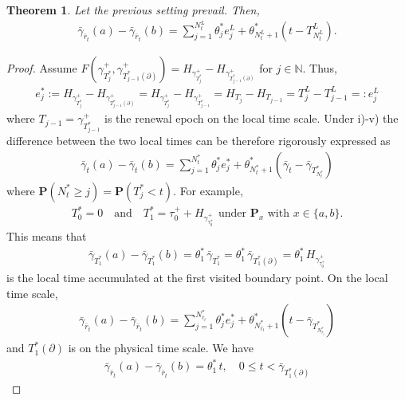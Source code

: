 \documentclass[10pt,a4paper]{article}
\numberwithin{equation}{section}
\theoremstyle{plain}
\newtheorem{theorem}{Theorem}
\theoremstyle{remark}
\begin{document}
\begin{theorem}
Let the previous setting prevail. Then, 
\begin{align}
\bar{\gamma}_{\bar{r}_t}(a) - \bar{\gamma}_{\bar{r}_t}(b) = \sum_{j=1}^{N^L_t} \theta^*_j e^L_j + \theta^*_{N^L_t+1} \left( t - T^L_{N^L_t} \right).
\label{thmDifLTbar} 
\end{align}
\label{thm:DifLTbar}
\end{theorem}


\begin{proof}
Assume $F(\gamma^+_{T^*_j}, \gamma^+_{T^*_{j-1}(\partial)}) = H_{\gamma^+_{T^*_j}} - H_{\gamma^+_{T^*_{j-1}(\partial)}}$ for $j \in \mathbb{N}$. Thus, 
\begin{align*}
e^*_j := H_{\gamma^+_{T^*_j}} - H_{\gamma^+_{T^*_{j-1}(\partial)}} = H_{\gamma^+_{T^*_j}} - H_{\gamma^+_{T^*_{j-1}}} = H_{T_j} - H_{T_{j-1}} = T^L_j - T^L_{j-1} =: e^L_j
\end{align*}
where $T_{j-1}=\gamma^+_{T^*_{j-1}}$ is the renewal epoch on the local time scale. Under i)-v) the difference between the two local times can be therefore rigorously expressed as
\begin{align*}
\bar{\gamma}_t(a) - \bar{\gamma}_t(b) = \sum_{j=1}^{N^*_t} \theta^*_j e^*_j + \theta^*_{N^*_t+1} \left( \bar{\gamma}_t - \bar{\gamma}_{T^*_{N^*_t}} \right)
\end{align*}
where $\mathbf{P}(N^*_t \geq j) = \mathbf{P}(T^*_j <t)$. For example,
\begin{align*}
T^*_0=0 \quad \textrm{and} \quad T^*_1 = \tau^+_0 +   H_{\gamma^+_{\tau^+_0}} \textrm{ under $\mathbf{P}_x$ with $x \in \{a,b\}$}.    
\end{align*}
This means that
\begin{align*}
\bar{\gamma}_{T^*_1}(a) - \bar{\gamma}_{T^*_1}(b) = \theta^*_1\, \bar{\gamma}_{T^*_1} = \theta^*_1\, \bar{\gamma}_{T^*_1 (\partial)} =  \theta^*_1\, H_{\gamma^+_{\tau^+_0}}
\end{align*}
is the local time accumulated at the first visited boundary point. On the local time scale, 
\begin{align*}
\bar{\gamma}_{\bar{r}_t}(a) - \bar{\gamma}_{\bar{r}_t}(b) = \sum_{j=1}^{N^*_{\bar{r}_t}} \theta^*_j e^*_j + \theta^*_{N^*_{\bar{r}_t}+1} \left( t - \bar{\gamma}_{T^*_{N^*_{\bar{r}_t}}} \right)
\end{align*}
and $T^*_1(\partial)$ is on the physical time scale. We have
\begin{align*}
\bar{\gamma}_{\bar{r}_t}(a) - \bar{\gamma}_{\bar{r}_t}(b) = \theta^*_1\, t, \quad 0 \leq t < \bar{\gamma}_{T^*_1(\partial)}

\end{align*}
\end{proof}
\end{document}
